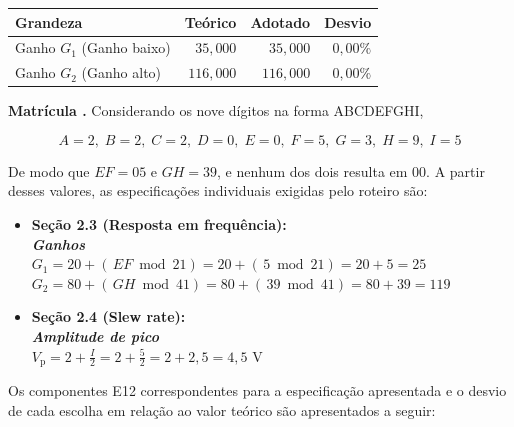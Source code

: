 \documentclass[11pt,a4paper]{article}
\begin{document}
\begin{center}
\renewcommand{\arraystretch}{1.2}
\begin{tabular}{@{}lrrr@{}}
\toprule
\textbf{Grandeza} & \textbf{Teórico} & \textbf{Adotado} & \textbf{Desvio} \\
\midrule
Ganho $G_1$ (Ganho baixo) & $35{,}000$ & $35{,}000$ & $0{,}00\%$ \\
Ganho $G_2$ (Ganho alto) & $116{,}000$ & $116{,}000$ & $0{,}00\%$ \\
\bottomrule
\end{tabular}
\end{center}

\begin{espec}

\textbf{Matrícula .} Considerando os nove dígitos na forma ABCDEFGHI,

\begin{equation}
    A=2,\; B=2,\; C=2,\; D=0,\; E=0,\; F=5,\; G=3,\; H=9,\; I=5
\end{equation}

De modo que $EF=05$ e $GH=39$, e nenhum dos dois resulta em $00$. A partir desses valores, as especificações individuais exigidas pelo roteiro são:

\begin{itemize}
    \item \textbf{Seção 2.3 (Resposta em frequência):} \\
    \textbf{\textit{Ganhos}} \\
    $G_1=20+(\,EF\bmod 21)=20+(\,5\bmod 21)=20+5=25$ \\
    $G_2=80+(\,GH\bmod 41)=80+(\,39\bmod 41)=80+39=119$

    \vspace{0.3cm}

    \item \textbf{Seção 2.4 (Slew rate):} \\
    \textbf{\textit{Amplitude de pico}} \\
    $V_{\text{p}}=2+\frac{I}{2}=2+\frac{5}{2}=2+2{,}5=4{,}5\text{ V}$
\end{itemize}

\end{espec}

Os componentes E12 correspondentes para a especificação apresentada e o desvio de cada escolha em relação ao valor teórico são apresentados a seguir:
\end{document}
